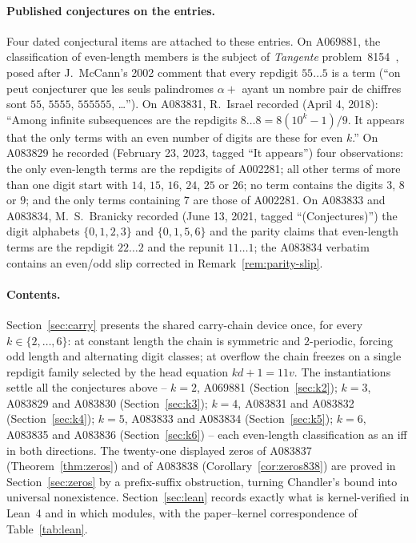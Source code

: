 \documentclass[12pt]{article}
\begin{document}
\paragraph{Published conjectures on the entries.}
Four dated conjectural items are attached to these
entries. On A069881, the classification of even-length
members is the subject of \emph{Tangente}
problem~8154~\cite{tangente}, posed after J.~McCann's
2002 comment that every repdigit $55\ldots5$ is a term
(``on peut conjecturer que les seuls palindromes
$\alpha+$ ayant un nombre pair de chiffres sont $55$,
$5555$, $555555$, \ldots''). On A083831, R.~Israel
recorded (April 4, 2018): ``Among infinite subsequences
are the repdigits $8\ldots8 = 8(10^k-1)/9$. It appears
that the only terms with an even number of digits are
these for even $k$.'' On A083829 he recorded (February
23, 2023, tagged ``It appears'') four observations:
the only even-length terms are the repdigits of
A002281; all other terms of more than one digit start
with $14$, $15$, $16$, $24$, $25$ or $26$; no term
contains the digits $3$, $8$ or $9$; and the only terms
containing $7$ are those of A002281. On A083833 and
A083834, M.~S.~Branicky recorded (June 13, 2021,
tagged ``(Conjectures)'') the digit alphabets
$\{0,1,2,3\}$ and $\{0,1,5,6\}$ and the parity claims
that even-length terms are the repdigit $22\ldots2$ and
the repunit $11\ldots1$; the A083834 verbatim contains
an even/odd slip corrected in
Remark~\ref{rem:parity-slip}.

\paragraph{Contents.}
Section~\ref{sec:carry} presents the shared carry-chain
device once, for every $k \in \{2,\dots,6\}$: at constant
length the chain is symmetric and $2$-periodic, forcing
odd length and alternating digit classes; at overflow the
chain freezes on a single repdigit family selected by the
head equation $kd+1 = 11v$. The instantiations settle
all the conjectures above -- $k=2$, A069881
(Section~\ref{sec:k2}); $k=3$, A083829 and A083830
(Section~\ref{sec:k3}); $k=4$, A083831 and A083832
(Section~\ref{sec:k4}); $k=5$, A083833 and A083834
(Section~\ref{sec:k5}); $k=6$, A083835 and A083836
(Section~\ref{sec:k6}) -- each even-length classification
as an iff in both directions. The twenty-one displayed
zeros of A083837 (Theorem~\ref{thm:zeros}) and of A083838
(Corollary~\ref{cor:zeros838}) are proved in
Section~\ref{sec:zeros} by a prefix-suffix obstruction,
turning Chandler's bound into universal nonexistence.
Section~\ref{sec:lean} records exactly what is
kernel-verified in Lean~4 and in which modules, with the
paper--kernel correspondence of Table~\ref{tab:lean}.
\end{document}
